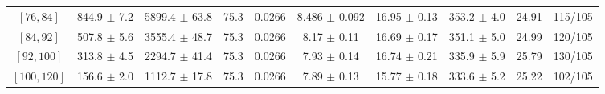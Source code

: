 \begin{tabular}{c||c|c|c|c|c|c|c||c|c}
$[76, 84]$ & 844.9 $\pm$ 7.2 & 5899.4 $\pm$ 63.8 & 75.3 & 0.0266 & 8.486 $\pm$ 0.092 & 16.95 $\pm$ 0.13 & 353.2 $\pm$ 4.0 & 24.91 & 115/105\\
$[84, 92]$ & 507.8 $\pm$ 5.6 & 3555.4 $\pm$ 48.7 & 75.3 & 0.0266 & 8.17 $\pm$ 0.11 & 16.69 $\pm$ 0.17 & 351.1 $\pm$ 5.0 & 24.99 & 120/105\\
$[92, 100]$ & 313.8 $\pm$ 4.5 & 2294.7 $\pm$ 41.4 & 75.3 & 0.0266 & 7.93 $\pm$ 0.14 & 16.74 $\pm$ 0.21 & 335.9 $\pm$ 5.9 & 25.79 & 130/105\\
$[100, 120]$ & 156.6 $\pm$ 2.0 & 1112.7 $\pm$ 17.8 & 75.3 & 0.0266 & 7.89 $\pm$ 0.13 & 15.77 $\pm$ 0.18 & 333.6 $\pm$ 5.2 & 25.22 & 102/105\\
\end{tabular}
